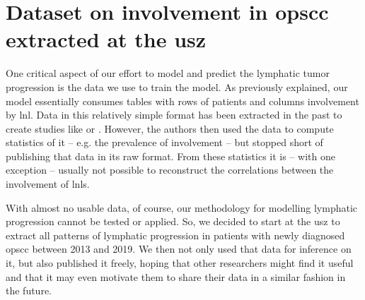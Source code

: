 \documentclass[\relativeRoot/main.tex]{subfiles}
\begin{document}
\chapter[
    USZ Dataset on involvement in OPSCC
]{
    Dataset on involvement in \acrlong{opscc} extracted at the \gls{usz}
}
\label{chap:dataset_usz}



One critical aspect of our effort to model and predict the lymphatic tumor progression is the data we use to train the model. As previously explained, our model essentially consumes tables with rows of patients and columns involvement by \gls{lnl}. Data in this relatively simple format has been extracted in the past to create studies like \cite{candela_patterns_1990} or \cite{shah_patterns_1990}. However, the authors then used the data to compute statistics of it -- e.g. the prevalence of involvement -- but stopped short of publishing that data in its raw format. From these statistics it is -- with one exception \cite{sanguineti_defining_2009} -- usually not possible to reconstruct the correlations between the involvement of \glspl{lnl}.

With almost no usable data, of course, our methodology for modelling lymphatic progression cannot be tested or applied. So, we decided to start at the \gls{usz} to extract all patterns of lymphatic progression in patients with newly diagnosed \gls{opscc} between 2013 and 2019. We then not only used that data for inference on it, but also published it freely, hoping that other researchers might find it useful and that it may even motivate them to share their data in a similar fashion in the future.






\end{document}
